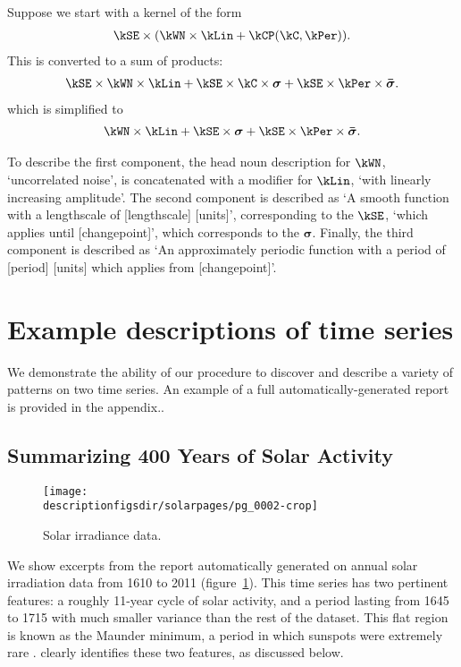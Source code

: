 Suppose we start with a kernel of the form
\begin{align*}
\kSE \times (\kWN \times \kLin + \kCP(\kC, \kPer)).
\end{align*}
This is converted to a sum of products:
\begin{align*}
\kSE \times \kWN \times \kLin + \kSE \times \kC \times \boldsymbol{\sigma} + \kSE \times \kPer \times \boldsymbol{\bar\sigma}.
\end{align*}
which is simplified to
\begin{align*}
\kWN \times \kLin + \kSE \times \boldsymbol{\sigma} + \kSE \times \kPer \times \boldsymbol{\bar\sigma}.
\end{align*}

To describe the first component, the head noun description for $\kWN$, `uncorrelated noise', is concatenated with a modifier for $\kLin$, `with linearly increasing amplitude'.
The second component is described as `A smooth function with a lengthscale of [lengthscale] [units]', corresponding to the $\kSE$, `which applies until [changepoint]', which corresponds to the $\boldsymbol{\sigma}$.
Finally, the third component is described as `An approximately periodic function with a period of [period] [units] which applies from [changepoint]'.


\section{Example descriptions of time series}
\label{sec:examples}
We demonstrate the ability of our procedure to discover and describe a variety of patterns on two time series.
An example of a full automatically-generated report is provided in the appendix..

\subsection{Summarizing 400 Years of Solar Activity}
\label{sec:solar}

\begin{figure}[h]
\centering
\texttt{[image: \\descriptionfigsdir/solarpages/pg\_0002-crop]}
\caption{
Solar irradiance data.}
\label{fig:solar}
\end{figure}

We show excerpts from the report automatically generated on annual solar irradiation data from 1610 to 2011 (figure~\ref{fig:solar}).
This time series has two pertinent features: a roughly 11-year cycle of solar activity, and a period lasting from 1645 to 1715 with much smaller variance than the rest of the dataset.
This flat region is known as the Maunder minimum, a period in which sunspots were extremely rare \citep{Lean1995-vp}.
\procedurename{} clearly identifies these two features, as discussed below.

